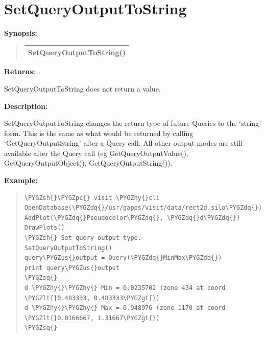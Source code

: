 \documentclass[letterpaper,10pt,english]{sphinxmanual}
\def\PYGZus{\char`\_}
\def\PYGZlt{\char`\<}
\def\PYGZgt{\char`\>}
\def\PYGZsh{\char`\#}
\def\PYGZpc{\char`\%}
\def\PYGZhy{\char`\-}
\def\PYGZsq{\char`\'}
\def\PYGZdq{\char`\"}
\renewcommand\PYGZsq{\textquotesingle}
\begin{document}
\section{SetQueryOutputToString}
\label{functions:setqueryoutputtostring}
\begin{DUlineblock}{0em}
\item[] \textbf{Synopsis:}
\end{DUlineblock}
\begin{quote}

\begin{tabulary}{\linewidth}{|L|}
\hline

SetQueryOutputToString()
\\
\hline\end{tabulary}

\end{quote}

\begin{DUlineblock}{0em}
\item[] 
\item[] \textbf{Returns:}
\item[] SetQueryOutputToString does not return a value.
\item[] 
\item[] \textbf{Description:}
\item[] SetQueryOutputToString changes the return type of future Queries to the
`string' form. This is the same as what would be returned by calling
`GetQueryOutputString' after a Query call. All other output modes are
still available after the Query call (eg GetQueryOutputValue(),
GetQueryOutputObject(), GetQueryOutputString()).
\end{DUlineblock}

\begin{DUlineblock}{0em}
\item[] 
\end{DUlineblock}

\begin{DUlineblock}{0em}
\item[] \textbf{Example:}
\item[] 
\end{DUlineblock}
\begin{quote}

\begin{Verbatim}[commandchars=\\\{\}]
\PYGZsh{}\PYGZpc{} visit \PYGZhy{}cli
OpenDatabase(\PYGZdq{}/usr/gapps/visit/data/rect2d.silo\PYGZdq{})
AddPlot(\PYGZdq{}Pseudocolor\PYGZdq{}, \PYGZdq{}d\PYGZdq{})
DrawPlots()
\PYGZsh{} Set query output type.
SetQueryOutputToString()
query\PYGZus{}output = Query(\PYGZdq{}MinMax\PYGZdq{})
print query\PYGZus{}output
\PYGZsq{}
d \PYGZhy{}\PYGZhy{} Min = 0.0235702 (zone 434 at coord \PYGZlt{}0.483333, 0.483333\PYGZgt{})
d \PYGZhy{}\PYGZhy{} Max = 0.948976 (zone 1170 at coord \PYGZlt{}0.0166667, 1.31667\PYGZgt{})
\PYGZsq{}
\end{Verbatim}
\end{quote}
\end{document}

